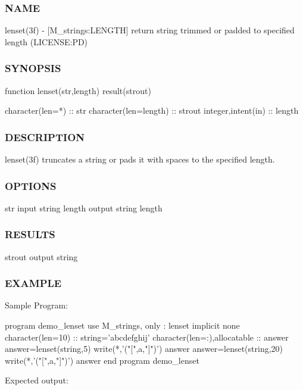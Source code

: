 \subsubsection*{N\+A\+ME}

lenset(3f) -\/ \mbox{[}M\+\_\+strings\+:L\+E\+N\+G\+TH\mbox{]} return string trimmed or padded to specified length (L\+I\+C\+E\+N\+SE\+:PD) 

\subsubsection*{S\+Y\+N\+O\+P\+S\+IS}

\begin{DoxyVerb}function lenset(str,length) result(strout)

 character(len=*)                     :: str
 character(len=length)                :: strout
 integer,intent(in)                   :: length
\end{DoxyVerb}
 \subsubsection*{D\+E\+S\+C\+R\+I\+P\+T\+I\+ON}

lenset(3f) truncates a string or pads it with spaces to the specified length. \subsubsection*{O\+P\+T\+I\+O\+NS}

str input string length output string length \subsubsection*{R\+E\+S\+U\+L\+TS}

strout output string \subsubsection*{E\+X\+A\+M\+P\+LE}

Sample Program\+: \begin{DoxyVerb} program demo_lenset
  use M_strings, only : lenset
  implicit none
  character(len=10)            :: string='abcdefghij'
  character(len=:),allocatable :: answer
     answer=lenset(string,5)
     write(*,'("[",a,"]")') answer
     answer=lenset(string,20)
     write(*,'("[",a,"]")') answer
 end program demo_lenset
\end{DoxyVerb}


Expected output\+: \begin{DoxyVerb}[abcde]
[abcdefghij          ]
\end{DoxyVerb}


